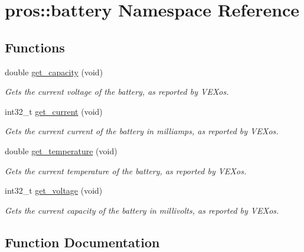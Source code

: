 \hypertarget{namespacepros_1_1battery}{}\section{pros\+::battery Namespace Reference}
\label{namespacepros_1_1battery}
\subsection*{Functions}
\begin{DoxyCompactItemize}
\item 
double \mbox{\hyperlink{namespacepros_1_1battery_a42876357c2ed5a047a535aca84f4458e}{get\+\_\+capacity}} (void)
\begin{DoxyCompactList}\small\item\em Gets the current voltage of the battery, as reported by V\+E\+Xos. \end{DoxyCompactList}\item 
int32\+\_\+t \mbox{\hyperlink{namespacepros_1_1battery_ad0f092e6341126d68ae15d41b5dba352}{get\+\_\+current}} (void)
\begin{DoxyCompactList}\small\item\em Gets the current current of the battery in milliamps, as reported by V\+E\+Xos. \end{DoxyCompactList}\item 
double \mbox{\hyperlink{namespacepros_1_1battery_a33d1a503808ed06148a1884e3ccf88ae}{get\+\_\+temperature}} (void)
\begin{DoxyCompactList}\small\item\em Gets the current temperature of the battery, as reported by V\+E\+Xos. \end{DoxyCompactList}\item 
int32\+\_\+t \mbox{\hyperlink{namespacepros_1_1battery_a2c325b346f66c15ca7e5a844a66b20d9}{get\+\_\+voltage}} (void)
\begin{DoxyCompactList}\small\item\em Gets the current capacity of the battery in millivolts, as reported by V\+E\+Xos. \end{DoxyCompactList}\end{DoxyCompactItemize}


\subsection{Function Documentation}
\mbox{\label{namespacepros_1_1battery_a42876357c2ed5a047a535aca84f4458e}} 
